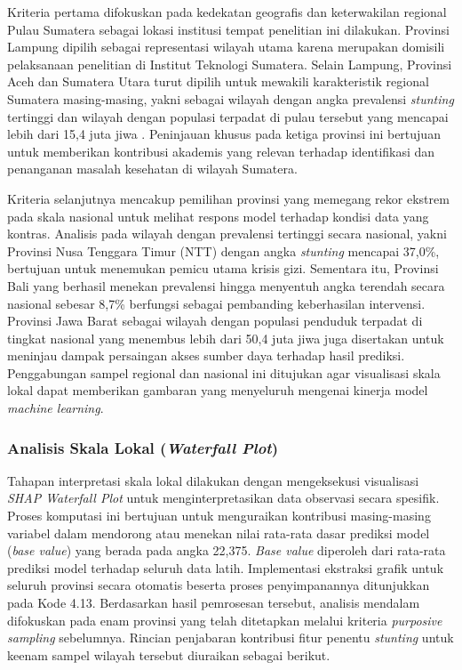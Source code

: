 Kriteria pertama difokuskan pada kedekatan geografis dan keterwakilan regional Pulau Sumatera sebagai lokasi institusi tempat penelitian ini dilakukan. Provinsi Lampung dipilih sebagai representasi wilayah utama karena merupakan domisili pelaksanaan penelitian di Institut Teknologi Sumatera. Selain Lampung, Provinsi Aceh dan Sumatera Utara turut dipilih untuk mewakili karakteristik regional Sumatera masing-masing, yakni sebagai wilayah dengan angka prevalensi \textit{stunting} tertinggi dan wilayah dengan populasi terpadat di pulau tersebut yang mencapai lebih dari 15,4 juta jiwa \cite{bps2024statistik}. Peninjauan khusus pada ketiga provinsi ini bertujuan untuk memberikan kontribusi akademis yang relevan terhadap identifikasi dan penanganan masalah kesehatan di wilayah Sumatera.

Kriteria selanjutnya mencakup pemilihan provinsi yang memegang rekor ekstrem pada skala nasional untuk melihat respons model terhadap kondisi data yang kontras. Analisis pada wilayah dengan prevalensi tertinggi secara nasional, yakni Provinsi Nusa Tenggara Timur (NTT) dengan angka \textit{stunting} mencapai 37,0\%, bertujuan untuk menemukan pemicu utama krisis gizi. Sementara itu, Provinsi Bali yang berhasil menekan prevalensi hingga menyentuh angka terendah secara nasional sebesar 8,7\% berfungsi sebagai pembanding keberhasilan intervensi. Provinsi Jawa Barat sebagai wilayah dengan populasi penduduk terpadat di tingkat nasional yang menembus lebih dari 50,4 juta jiwa \cite{bps2024statistik} juga disertakan untuk meninjau dampak persaingan akses sumber daya terhadap hasil prediksi. Penggabungan sampel regional dan nasional ini ditujukan agar visualisasi skala lokal dapat memberikan gambaran yang menyeluruh mengenai kinerja model \textit{machine learning}.

\subsubsection{Analisis Skala Lokal (\textit{Waterfall Plot})}
Tahapan interpretasi skala lokal dilakukan dengan mengeksekusi visualisasi \textit{SHAP Waterfall Plot} untuk menginterpretasikan data observasi secara spesifik. Proses komputasi ini bertujuan untuk menguraikan kontribusi masing-masing variabel dalam mendorong atau menekan nilai rata-rata dasar prediksi model (\textit{base value}) yang berada pada angka 22,375. \textit{Base value} diperoleh dari rata-rata prediksi model terhadap seluruh data latih. Implementasi ekstraksi grafik untuk seluruh provinsi secara otomatis beserta proses penyimpanannya ditunjukkan pada Kode 4.13. Berdasarkan hasil pemrosesan tersebut, analisis mendalam difokuskan pada enam provinsi yang telah ditetapkan melalui kriteria \textit{purposive sampling} sebelumnya. Rincian penjabaran kontribusi fitur penentu \textit{stunting} untuk keenam sampel wilayah tersebut diuraikan sebagai berikut.


